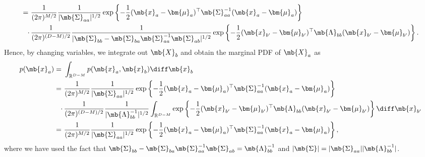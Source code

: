 \begin{exercise}
\begin{enumerate}
\begin{solution}
\begin{align*}
                    =\      & \frac{1}{(2\pi)^{M/2}}\frac{1}{|\mb{\Sigma}_{aa}|^{1/2}}\exp\left\{-\frac{1}{2}(\mb{x}_a-\bm{\mu}_a)^{\top}\mb{\Sigma}_{aa}^{-1}(\mb{x}_a-\bm{\mu}_a)\right\}                                                                     \\
                    \cdot\, & \frac{1}{(2\pi)^{(D-M)/2}}\frac{1}{|\mb{\Sigma}_{bb}-\mb{\Sigma}_{ba}\mb{\Sigma}_{aa}^{-1}\mb{\Sigma}_{ab}|^{1/2}}\exp\left\{-\frac{1}{2}(\mb{x}_{b'}-\bm{\mu}_{b'})^{\top}\mb{\Lambda}_{bb}(\mb{x}_{b'}-\bm{\mu}_{b'})\right\}.
                \end{align*}
                Hence, by changing variables, we integrate out $\mb{X}_b$ and obtain the marginal PDF of $\mb{X}_a$ as
                \begin{align*}
                    p(\mb{x}_a)
                    =\      & \int_{\mathbb{R}^{D-M}} p(\mb{x}_a,\mb{x}_b)\diff\mb{x}_b                                                                                                                                                              \\
                    =\      & \frac{1}{(2\pi)^{M/2}}\frac{1}{|\mb{\Sigma}_{aa}|^{1/2}}\exp\left\{-\frac{1}{2}(\mb{x}_a-\bm{\mu}_a)^{\top}\mb{\Sigma}_{aa}^{-1}(\mb{x}_a-\bm{\mu}_a)\right\}                                                          \\
                    \cdot\, & \frac{1}{(2\pi)^{(D-M)/2}}\frac{1}{|\mb{\Lambda}_{bb}^{-1}|^{1/2}}\int_{\mathbb{R}^{D-M}}\exp\left\{-\frac{1}{2}(\mb{x}_{b'}-\bm{\mu}_{b'})^{\top}\mb{\Lambda}_{bb}(\mb{x}_{b'}-\bm{\mu}_{b'})\right\}\diff\mb{x}_{b'} \\
                    =\      & \frac{1}{(2\pi)^{M/2}}\frac{1}{|\mb{\Sigma}_{aa}|^{1/2}}\exp\left\{-\frac{1}{2}(\mb{x}_a-\bm{\mu}_a)^{\top}\mb{\Sigma}_{aa}^{-1}(\mb{x}_a-\bm{\mu}_a)\right\},
                \end{align*}
                where we have used the fact that $\mb{\Sigma}_{bb}-\mb{\Sigma}_{ba}\mb{\Sigma}_{aa}^{-1}\mb{\Sigma}_{ab}=\mb{\Lambda}_{bb}^{-1}$ and $|\mb{\Sigma}|=|\mb{\Sigma}_{aa}||\mb{\Lambda}_{bb}^{-1}|$.
                \qedhere
            \end{solution}
            
            
    \end{enumerate}
\end{exercise}
\newpage




